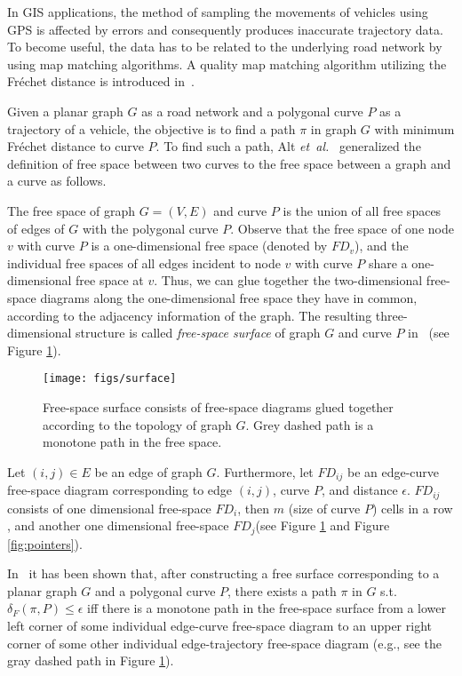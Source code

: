 \documentclass[12pt]{dalthesis}
\newcommand{\etal}{{\em et~al.\/}}
\newcommand{\Frechet}{Fr\'echet }
\newcommand{\distF}{\delta_F}
\begin{document}
In GIS applications, the method of sampling the  movements of vehicles using GPS is affected 
by errors and consequently produces inaccurate trajectory data. To become useful, 
the data has to be related to the underlying road network by using map matching 
algorithms. A quality map matching algorithm utilizing the \Frechet distance is 
introduced in~\cite{AltERW03a}.

Given a planar graph $G$ as a road network and a polygonal curve $P$ as a 
trajectory of a vehicle, the objective is to find a path $\pi$  
in graph $G$ with minimum \Frechet distance to curve $P$. To find such a path, 
Alt \etal ~\cite{AltERW03a} generalized  the definition of free space 
between two curves to the free space between a graph and a curve as follows.

The free space of graph  $G = (V,E)$ and  curve $P$ is the union of all free spaces of edges of 
$G$ with the polygonal curve $P$. Observe that the free space of one node $v$ with 
curve $P$ is a one-dimensional free space (denoted by $FD_v$), 
and the individual free spaces of all 	edges 
incident to node $v$ with curve $P$ share a one-dimensional free space at $v$. 
Thus, we can 
glue together the two-dimensional free-space diagrams along the one-dimensional free space 
they have in common, according to the adjacency information of the graph. 
The resulting three-dimensional structure is called \emph{free-space surface} of graph $G$ and curve $P$ 
in~\cite{AltERW03a} (see Figure \ref{fig:freespacesurface}). 

\begin{figure}[t]
	\centering
	\texttt{[image: figs/surface]}
	\caption{Free-space surface consists of free-space diagrams glued
together according to the topology of graph $G$. Grey dashed path is
a monotone path in the free space.}
	\label{fig:freespacesurface}
\end{figure}

Let $(i,j) \in E$ be an edge of graph $G$. Furthermore,  
let $FD_{ij}$ be an edge-curve free-space diagram 
corresponding to edge $(i,j)$, curve $P$, and distance $\epsilon$.
$FD_{ij}$  consists of one dimensional free-space $FD_i$,
then $m$ (size of curve $P$) cells in a row , 
and another one dimensional free-space $FD_j$(see Figure \ref{fig:freespacesurface}
and Figure \ref{fig:pointers}).


In~\cite{AltERW03a} it has been shown that, after constructing 
a free surface corresponding 
to a planar graph $G$ and a polygonal curve $P$,  there exists a 
path $\pi$ in $G$ s.t. $\distF(\pi,P) \le \epsilon$ 
iff there is a monotone path 
in the free-space surface from a lower left corner of
some individual edge-curve free-space diagram to an upper
 right corner of some other individual edge-trajectory 
free-space diagram (e.g., see the gray dashed path 
in Figure \ref{fig:freespacesurface}).
\end{document}
